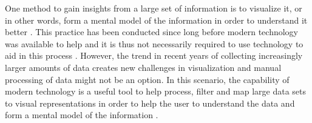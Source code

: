 One method to gain insights from a large set of information is to visualize it, or in other words, form a mental model of the information in order to understand it better \cite{spence_information_2014}. 
This practice has been conducted since long before modern technology was available to help and it is thus not necessarily required to use technology to aid in this process \cite{friendly_brief_2008}. 
However, the trend in recent years of collecting increasingly larger amounts of data creates new challenges in visualization and manual processing of data might not be an option. 
In this scenario, the capability of modern technology is a useful tool to help process, filter and map large data sets to visual representations in order to help the user to understand the data and form a mental model of the information \cite{card_structure_1997}.
